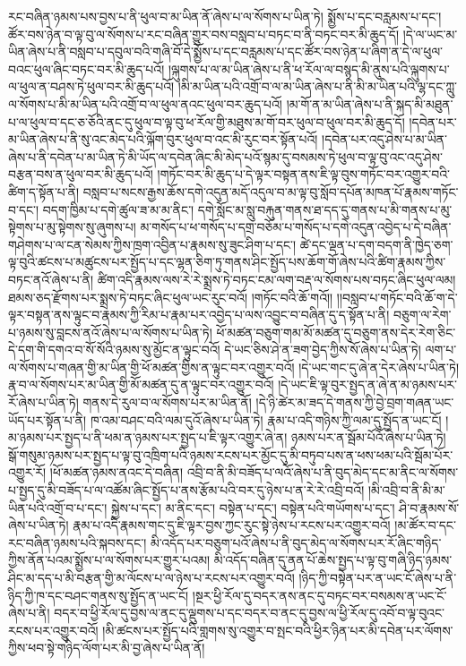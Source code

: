 རང་བཞིན་ཉམས་པས་བྱས་པ་ནི་ཕུལ་བ་མ་ཡིན་ནོ་ཞེས་པ་ལ་སོགས་པ་ཡིན་ཏེ། སྨྱོས་པ་དང་བརླམས་པ་དང་། ཚོར་བས་ཉེན་བ་ལྟ་བུ་ལ་སོགས་པ་རང་བཞིན་གྱུར་བས་བསླབ་པ་བཏང་བ་ནི་བཏང་བར་མི་ཆུད་དོ། །དེ་ལ་ཡང་མ་ཡིན་ཞེས་པ་ནི་བསླབ་པ་དབུལ་བའི་གཞི་བོ་དེ་སྨྱོས་པ་དང་བརླམས་པ་དང་ཚོར་བས་ཉེན་པ་ཞིག་ན་དེ་ལ་ཕུལ་བའང་ཕུལ་ཞིང་བཏང་བར་མི་ཆུད་པའོ། །ལྐུགས་པ་ལ་མ་ཡིན་ཞེས་པ་ནི་ཕ་རོལ་ལ་བསྙད་མི་ནུས་པའི་ལྐུགས་པ་ལ་ཕུལ་ན་བཤས་ཏེ་ཕུལ་བར་མི་ཆུད་པའོ། །མི་མ་ཡིན་པའི་འགྲོ་བ་ལ་མ་ཡིན་ཞེས་པ་ནི་མི་མ་ཡིན་པའི་ལྷ་དང་ཀླུ་ལ་སོགས་པ་མི་མ་ཡིན་པའི་འགྲོ་བ་ལ་ཕུལ་ནའང་ཕུལ་བར་ཆུད་པའོ། །མ་གོ་ན་མ་ཡིན་ཞེས་པ་ནི་སྐད་མི་མཐུན་པ་ལ་ཕུལ་བ་དང་ཅ་ཅོའི་ནང་དུ་ཕུལ་བ་ལྟ་བུ་ཕ་རོལ་གྱི་མཐུས་མ་གོ་བར་ཕུལ་བ་ཕུལ་བར་མི་ཆུད་དོ། །དབེན་པར་མ་ཡིན་ཞེས་པ་ནི་སུ་འང་མེད་པའི་ལྐོག་བུར་ཕུལ་བ་འང་མི་རུང་བར་སྟོན་པའོ། །དབེན་པར་འདུ་ཤེས་པ་མ་ཡིན་ཞེས་པ་ནི་དབེན་པ་མ་ཡིན་ཏེ་མི་ཡོད་ལ་དབེན་ཞིང་མི་མེད་པའོ་སྙམ་དུ་བསམས་ཏེ་ཕུལ་བ་ལྟ་བུ་འང་འདུ་ཤེས་བརྩན་བས་ན་ཕུལ་བར་མི་ཆུད་པའོ། །གཏོང་བར་མི་ཆུད་པ་དེ་ལྟར་བསྟན་ནས་ཇི་ལྟ་བུས་གཏོང་བར་འགྱུར་བའི་ཚིག་ད་སྟོན་པ་ནི། བསླབ་པ་སངས་རྒྱས་ཆོས་དགེ་འདུན་མདོ་འདུལ་བ་མ་ལྟ་བུ་སློབ་དཔོན་མཁན་པོ་རྣམས་གཏོང་བ་དང་། བདག་ཁྱིམ་པ་དགེ་ཚུལ་ཟ་མ་མ་ནིང་། དགེ་སློང་མ་སླུ་བརྐུན་གནས་ཐ་དད་དུ་གནས་པ་མི་གནས་པ་མུ་སྟེགས་པ་མུ་སྟེགས་སུ་ཞུགས་པ། མ་གསོད་པ་ཕ་གསོད་པ་དགྲ་བཅོམ་པ་གསོད་པ་དགེ་འདུན་འབྱེད་པ་དེ་བཞིན་གཤེགས་པ་ལ་ངན་སེམས་ཀྱིས་ཁྲག་འབྱིན་པ་རྣམས་སུ་ཟུང་ཤིག་པ་དང་། ཚེ་དང་ལྡན་པ་དག་བདག་ནི་ཁྱེད་ཅག་ལྟ་བུའི་ཚངས་པ་མཚུངས་པར་སྤྱོད་པ་དང་ལྷན་ཅིག་ཏུ་གནས་ཤིང་སྤྱོད་པས་ཆོག་གོ་ཞེས་པའི་ཚིག་རྣམས་ཀྱིས་བཏང་ནའོ་ཞེས་པ་ནི། ཚིག་འདི་རྣམས་ལས་རེ་རེ་སྨྲས་ཏེ་བཏང་ངམ་ལག་བརྡ་ལ་སོགས་པས་བཏང་ཞིང་ཕུལ་ལམ། ཐམས་ཅད་རྫོགས་པར་སྨྲས་ཏེ་བཏང་ཞིང་ཕུལ་ཡང་རུང་བའོ། །གཏོང་བའི་ཆོ་གའོ།། །།བསླབ་པ་གཏོང་བའི་ཆོ་ག་དེ་ལྟར་བསྟན་ནས་ལྟུང་བ་རྣམས་ཀྱི་རིམ་པ་རྣམ་པར་འབྱེད་པ་ལས་འབྱུང་བ་བཞིན་དུ་ད་སྟོན་པ་ནི། བཅུག་ལ་རེག་པ་ཉམས་སུ་བླངས་ནའོ་ཞེས་པ་ལ་སོགས་པ་ཡིན་ཏེ། ཕོ་མཚན་བཅུག་གམ་མོ་མཚན་དུ་བཅུག་ནས་དེར་རེག་ཅིང་དེ་དག་གི་དགའ་བ་སོ་སོའི་ཉམས་སུ་མྱོང་ན་ལྟུང་བའོ། དེ་ཡང་ཅིས་ཤེ་ན་ཟག་བྱེད་ཀྱིས་སོ་ཞེས་པ་ཡིན་ཏེ། ལག་པ་ལ་སོགས་པ་གཞན་གྱི་མ་ཡིན་གྱི་ཕོ་མཚན་གྱིས་ན་ལྟུང་བར་འགྱུར་བའོ། །དེ་ཡང་གང་དུ་ཞེ་ན་དེར་ཞེས་པ་ཡིན་ཏེ། རྣ་བ་ལ་སོགས་པར་མ་ཡིན་གྱི་མོ་མཚན་དུ་ན་ལྟུང་བར་འགྱུར་བའོ། །དེ་ཡང་ཇི་ལྟ་བུར་སྤྱད་ན་ཞེ་ན་མ་ཉམས་པར་རོ་ཞེས་པ་ཡིན་ཏེ། གནས་དེ་རུལ་བ་ལ་སོགས་པར་མ་ཡིན་ནོ། །དེ་ཉི་ཚེར་མ་ཟད་དེ་གནས་ཀྱི་བྱེ་བྲག་གཞན་ཡང་ཡོད་པར་སྟོན་པ་ནི། ཁ་འམ་བཤང་བའི་ལམ་དུའོ་ཞེས་པ་ཡིན་ཏེ། རྣམ་པ་འདི་གཉིས་ཀྱི་ལམ་དུ་སྤྱོད་ན་ཡང་ངོ། །མ་ཉམས་པར་སྤྱད་པ་ནི་ཕམ་ན་ཉམས་པར་སྤྱད་པ་ཇི་ལྟར་འགྱུར་ཞེ་ན། ཉམས་པར་ན་སྦོམ་པོའོ་ཞེས་པ་ཡིན་ཏེ། སྒོ་གསུམ་ཉམས་པར་སྤྱད་པ་ལྟ་བུ་འཁྲིག་པའི་ཉམས་རངས་པར་མྱོང་དུ་མི་བཏུབ་པས་ན་ཕས་ཕམ་པའི་སྦོམ་པོར་འགྱུར་རོ། །ཕོ་མཚན་ཉམས་ནའང་དེ་བཞིན། འབྲི་བ་ནི་མི་བཟོད་པ་ལའོ་ཞེས་པ་ནི་བུད་མེད་དང་མ་ནིང་ལ་སོགས་པ་སྤྱད་དུ་མི་བཟོད་པ་ལ་འཚོམ་ཞིང་སྤྱོད་པ་ནས་རྩོམ་པའི་བར་དུ་ཉེས་པ་ན་རེ་རེ་འབྲི་བའོ། །མི་འབྲི་བ་ནི་མི་མ་ཡིན་པའི་འགྲོ་བ་པ་དང་། སྐྱེས་པ་དང་། མ་ནིང་དང་། བསྟེན་པ་དང་། བསྟེན་པའི་གཡོགས་པ་དང་། ཤི་བ་རྣམས་སོ་ཞེས་པ་ཡིན་ཏེ། རྣམ་པ་འདི་རྣམས་གང་དུ་ཇི་ལྟར་བྱས་ཀྱང་རུང་སྟེ་ཉེས་པ་རངས་པར་འགྱུར་བའོ། །མ་ཚོར་བ་དང་རང་བཞིན་ཉམས་པའི་སྐབས་དང་། མི་འདོད་པར་བཅུག་པའོ་ཞེས་པ་ནི་བུད་མེད་ལ་སོགས་པར་རོ་ཞིང་གཉིད་ཀྱིས་ནོན་པའམ་སྨྱོས་པ་ལ་སོགས་པར་གྱུར་པའམ། མི་འདོད་བཞིན་དུ་ནན་པོ་ཆེས་སྤྱད་པ་ལྟ་བུ་གཞི་ཉིད་ཉམས་ཤིང་མ་དད་པ་མི་བརྩན་གྱི་མ་ལོངས་པ་ལ་ཉེས་པ་རངས་པར་འགྱུར་བའོ། །ཉིད་ཀྱི་བསྟེན་པར་ན་ཡང་ངོ་ཞེས་པ་ནི་ཉིད་ཀྱི་ཁ་དང་བཤང་གནས་སུ་སྤྱོད་ན་ཡང་ངོ། །སྔར་ཕྱི་རོལ་དུ་བདར་ནས་ནང་དུ་བཏང་བར་བསམས་ན་ཡང་ངོ་ཞེས་པ་ནི། བདར་བ་ཕྱི་རོལ་དུ་བྱས་ལ་ནང་དུ་ལྡུགས་པ་དང་བདར་བ་ནང་དུ་བྱས་ལ་ཕྱི་རོལ་དུ་འབོ་བ་ལྟ་བུའང་རངས་པར་འགྱུར་བའོ། །མི་ཚངས་པར་སྤྱོད་པའི་གླགས་སུ་འགྱུར་བ་སྤང་བའི་ཕྱིར་ཉིན་པར་མི་དབེན་པར་ལོགས་ཀྱིས་ཕབ་སྟེ་གཉིད་ལོག་པར་མི་བྱ་ཞེས་པ་ཡིན་ནོ། 
